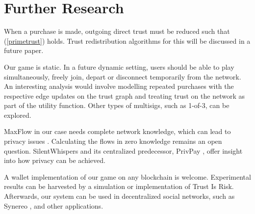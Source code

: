 \section{Further Research}

    When a purchase is made, outgoing direct trust must be reduced such that (\ref{primetrust}) holds. Trust redistribution
    algorithms for this will be discussed in a future paper.

    Our game is static. In a future dynamic setting, users should be able to play simultaneously, freely join, depart or
    disconnect temporarily from the network. An interesting analysis would involve modelling repeated purchases with the
    respective edge updates on the trust graph and treating trust on the network as part of the utility function. Other types
    of multisigs, such as 1-of-3, can be explored.

    MaxFlow in our case needs complete network knowledge, which can lead to privacy issues \cite{deanonymisation}. Calculating
    the flows in zero knowledge remains an open question. SilentWhispers \cite{silentwhispers} and its centralized
    predecessor, PrivPay \cite{privpay}, offer insight into how privacy can be achieved.

    A wallet implementation of our game on any blockchain is welcome. Experimental results can be harvested by a simulation or
    implementation of Trust Is Risk. Afterwards, our system can be used in decentralized social networks, such as Synereo
    \cite{synereo}, and other applications.
